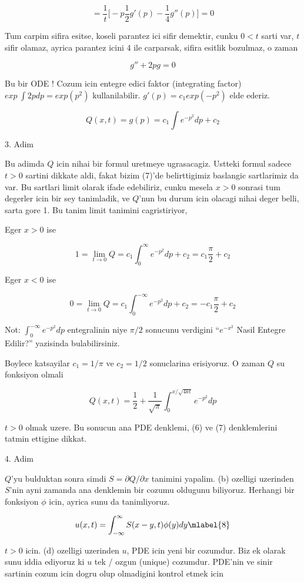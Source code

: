\documentclass[12pt,fleqn]{article}\usepackage{../common}
\begin{document}
\[ = \frac{1}{t} \bigg[
-p\frac{1}{2}g'(p) - \frac{1}{4}g''(p)
\bigg] = 0
 \]

Tum carpim sifira esitse, koseli parantez ici sifir demektir, cunku $0 < t$
sarti var, $t$ sifir olamaz, ayrica parantez icini 4 ile carparsak, sifira
esitlik bozulmaz, o zaman 

\[ g'' + 2pg = 0 \]

Bu bir ODE ! Cozum icin entegre edici faktor (integrating factor)
 $exp \
\int 2p dp = exp(p^2)$ kullanilabilir. $g'(p) = c_1 exp(-p^2)$ elde
ederiz. 

\[ Q(x,t) = g(p) = c_1 \int e^{-p^2} dp + c_2 \]

3. Adim 

Bu adimda $Q$ icin nihai bir formul uretmeye ugrasacagiz. Ustteki formul
sadece $t>0$ sartini dikkate aldi, fakat bizim (7)'de belirttigimiz
baslangic sartlarimiz da var. Bu sartlari limit olarak ifade edebiliriz,
cunku mesela $x>0$ sonrasi tum degerler icin bir sey tanimladik, ve $Q$'nun bu
durum icin olacagi nihai deger belli, sarta gore 1. Bu tanim limit tanimini
cagristiriyor, 

Eger $x>0$ ise

\[ 1 = \lim_{t \to 0} Q = 
 c_1 \int_0^{\infty} e^{-p^2} dp + c_2 = 
c_1 \frac{\pi}{2} + c_2
 \]


Eger $x<0$ ise

\[ 0 = \lim_{t \to 0} Q = 
 c_1 \int_0^{-\infty} e^{-p^2} dp + c_2 = 
-c_1 \frac{\pi}{2} + c_2
 \]

Not: $\int_0^{-\infty} e^{-p^2} dp$ entegralinin niye $\pi/2$ sonucunu
verdigini ``$e^{-x^2}$ Nasil Entegre Edilir?'' yazisinda bulabilirsiniz. 

Boylece katsayilar $c_1 = 1/\pi$ ve $c_2 = 1/2$ sonuclarina erisiyoruz. O
zaman $Q$ su fonksiyon olmali

\[ Q(x,t) = 
\frac{1}{2} + \frac{ 1}{\sqrt{\pi}} \int _{0}^{x/\sqrt{4kt}} e^{-p^2} dp
 \]

$t>0$ olmak uzere. Bu sonucun ana PDE denklemi, (6) ve (7) denklemlerini
tatmin ettigine dikkat. 

4. Adim

$Q$'yu bulduktan sonra simdi $S = \partial Q/\partial x$ tanimini
yapalim. (b) ozelligi uzerinden $S$'nin ayni zamanda ana denklemin bir
cozumu oldugunu biliyoruz. Herhangi bir fonksiyon $\phi$ icin, ayrica sunu
da tanimliyoruz. 

\[ u(x,t) = \int _{-\infty}^{\infty} S(x-y,t) \phi(y)dy 
\mlabel{8}
\]

$t>0$ icin. (d) ozelligi uzerinden $u$, PDE icin yeni bir cozumdur. Biz ek
olarak sunu iddia ediyoruz ki $u$ tek / ozgun (unique) cozumdur. PDE'nin ve
sinir sartinin cozum icin dogru olup olmadigini kontrol etmek icin 
\end{document}
